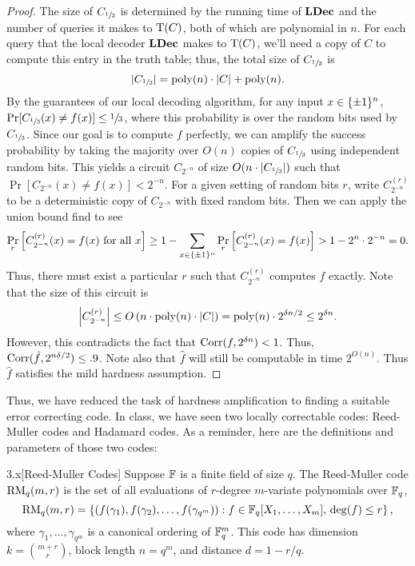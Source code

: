 \documentclass[11pt]{article}
\begin{document}
\begin{proof}
    The size of $C_{\sfrac{1}{3}}$ is determined by the running time of $\text{\textbf{LDec}}$ and the number of queries it makes to $\mathrm{T}(C)$, both of which are polynomial in $n$. For each query that the local decoder $\text{\textbf{LDec}}$ makes to $\mathrm{T}(C)$, we'll need a copy of $C$ to compute this entry in the truth table; thus, the total size of $C_{\sfrac{1}{3}}$ is 
    \begin{equation*}
        |C_{\sfrac{1}{3}}| = \mathrm{poly}(n) \cdot |C| + \mathrm{poly}(n).
    \end{equation*}
    By the guarantees of our local decoding algorithm, for any input $x \in \{\pm 1\}^n$, $\Pr[C_{\sfrac{1}{3}}(x) \neq f(x)] \leq \sfrac{1}{3}$, where this probability is over the random bits used by $C_{\sfrac{1}{3}}$. Since our goal is to compute $f$ perfectly, we can amplify the success probability by taking the majority over $O(n)$ copies of $C_{\sfrac{1}{3}}$ using independent random bits. This yields a circuit $C_{2^{-n}}$ of size $O(n \cdot |C_{\sfrac{1}{3}}|)$ such that $\Pr[C_{2^{-n}}(x) \neq f(x)] < 2^{-n}$. For a given setting of random bits $r$, write $C_{2^{-n}}^{(r)}$ to be a deterministic copy of $C_{2^{-n}}$ with fixed random bits. Then we can apply the union bound find to see
    \begin{equation*}
        \Pr_r\left[C^{(r)}_{2^{-n}}(x) = f(x) \text{ for all $x$}\right] \geq 1 - \sum_{x \in \{\pm 1\}^n} \Pr_r\left[C^{(r)}_{2^{-n}}(x) = f(x)\right] > 1 - 2^{n} \cdot 2^{-n} = 0.
    \end{equation*}
    Thus, there must exist a particular $r$ such that $C^{(r)}_{2^{-n}}$ computes $f$ exactly. Note that the size of this circuit is 
    \begin{equation*}
        \left|C^{(r)}_{2^{-n}}\right| \leq O\left(n \cdot \mathrm{poly}(n) \cdot |C|\right) = \mathrm{poly}(n) \cdot 2^{\delta n / 2} \leq 2^{\delta n}.
    \end{equation*}
    However, this contradicts the fact that $\mathrm{Corr}(f, 2^{\delta n}) < 1$. Thus, $\mathrm{Corr}(\hat{f}, 2^{n\delta / 2}) \leq .9$. Note also that $\hat{f}$ will still be computable in time $2^{O(n)}$. Thus $\hat{f}$ satisfies the mild hardness assumption.
\end{proof}

Thus, we have reduced the task of hardness amplification to finding a suitable error correcting code. In class, we have seen two locally correctable codes: Reed-Muller codes and Hadamard codes. As a reminder, here are the definitions and parameters of those two codes:

\begin{definition}{3.x}[Reed-Muller Codes]
    Suppose $\mathbb{F}$ is a finite field of size $q$. The Reed-Muller code $\mathrm{RM}_q(m, r)$ is the set of all evaluations of $r$-degree $m$-variate polynomials over $\mathbb{F}_q$,
    \begin{equation*}
        \mathrm{RM}_q(m ,r) = \left\{(f(\gamma_1), f(\gamma_2), \ldots, f(\gamma_{q^m})) : f \in \mathbb{F}_q[X_1, \ldots, X_m], \, \deg (f) \leq r\right\},
    \end{equation*}
    where $\gamma_1, \ldots, \gamma_{q^m}$ is a canonical ordering of $\mathbb{F}_q^m$. This code has dimension $k = \binom{m + r}{r}$, block length $n = q^m$, and distance $d = 1 - r / q$.
\end{definition}
\end{document}
